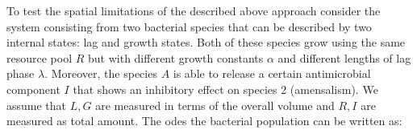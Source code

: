\documentclass[10pt,A4paper]{article}
\numberwithin{equation}{section}
\begin{document}
%
%
To test the spatial limitations of the described above approach consider the system consisting from
two bacterial species that can be described by two internal states: lag and growth states.
Both of these species grow using the same resource pool $R$ but with different growth constants
$\alpha$ and different lengths of lag phase $\lambda$.
Moreover, the species $A$ is able to release a certain antimicrobial component $I$ that shows an
inhibitory effect on species 2 (amensalism).
We assume that $L,G$ are measured in terms of the overall volume and $R,I$ are measured as total
amount.
The \acp{ode} the bacterial population can be written as:
\end{document}
